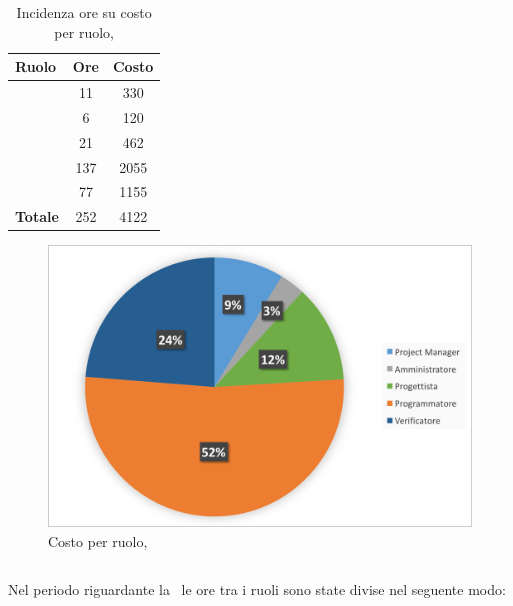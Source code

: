 \begin{table}[h]
	\begin{center}
		\begin{tabular}{|l|c|c|}
			\hline
			\textbf{Ruolo}	& \textbf{Ore} &	\textbf{Costo}	 \\
			\hline
			\textit{\Pm}	&	11	&	330\\
			\hline
			\textit{\Am}	&	6	&	120	\\
			\hline
			\textit{\Prog}	&	21	&	462	\\
			\hline
			\textit{\Progr}	&	137	&	2055\\
			\hline
			\textit{\Ver}	&	77	&	1155\\
			\hline
			\textbf{Totale}	&	252	&	4122\\
			\hline
		\end{tabular}
	\end{center}
	\caption{Incidenza ore su costo per ruolo, \COD}
\end{table}

\begin{figure}[H]
	\centering 
	\includegraphics[scale=0.7]{Immagini/GraficiTorteSezione6/COD.png}
	\caption{Costo per ruolo, \COD}
\end{figure}

\newpage
\subsection{\VV}
Nel periodo riguardante la \VV\ le ore tra i ruoli sono state divise nel seguente modo:


